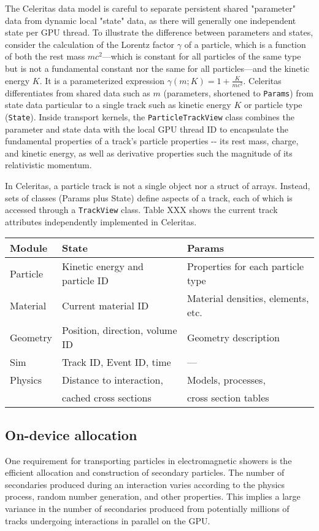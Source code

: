 The Celeritas data model is careful to separate persistent shared
"parameter" data from dynamic local "state" data, as there will
generally one independent state per GPU thread. To illustrate the
difference between parameters and states, consider the calculation of
the Lorentz factor \(\gamma\) of a particle, which is a function of both
the rest mass \(mc^2\)---which is constant for all particles of the same
type but is not a fundamental constant nor the same for all
particles---and the kinetic energy \(K\). It is a parameterized
expression \(\gamma(m;K) = 1 + \frac{K}{mc^2}\). Celeritas
differentiates from shared data such as \(m\) (parameters, shortened to
\texttt{Params}) from state data particular to a single track such as
kinetic energy \(K\) or particle type (\texttt{State}). Inside transport
kernels, the \texttt{ParticleTrackView} class combines the parameter and
state data with the local GPU thread ID to encapsulate the fundamental
properties of a track's particle properties -\/- its rest mass, charge,
and kinetic energy, as well as derivative properties such the magnitude
of its relativistic momentum.

In Celeritas, a particle track is not a single object nor a struct of
arrays. Instead, sets of classes (Params plus State) define aspects of a
track, each of which is accessed through a \texttt{TrackView} class.
Table XXX shows the current track attributes independently implemented
in Celeritas.

\begin{longtable}[]{@{}lll@{}}
\toprule
Module & State & Params\tabularnewline
\midrule
\endhead
Particle & Kinetic energy and particle ID & Properties for each particle
type\tabularnewline
Material & Current material ID & Material densities, elements,
etc.\tabularnewline
Geometry & Position, direction, volume ID & Geometry
description\tabularnewline
Sim & Track ID, Event ID, time & ---\tabularnewline
Physics & Distance to interaction, & Models, processes,\tabularnewline
& cached cross sections & cross section tables\tabularnewline
\bottomrule
\end{longtable}

\hypertarget{on-device-allocation}{%
\subsection{On-device allocation}\label{on-device-allocation}}

One requirement for transporting particles in electromagnetic showers is
the efficient allocation and construction of secondary particles. The
number of secondaries produced during an interaction varies according to
the physics process, random number generation, and other properties.
This implies a large variance in the number of secondaries produced from
potentially millions of tracks undergoing interactions in parallel on
the GPU.

